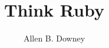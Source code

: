 \documentclass[10pt]{book}
\title{Think Ruby}
\author{Allen B. Downey}
\newif\ifplastex
\begin{document}
\frontmatter

\ifplastex
    \usepackage{localdef}
    \maketitle

\newcount\anchorcnt
\newcommand*{\Anchor}[1]{%
  \@bsphack%
    \Hy@GlobalStepCount\anchorcnt%
    \edef\@currentHref{anchor.\the\anchorcnt}%
    \Hy@raisedlink{\hyper@anchorstart{\@currentHref}\hyper@anchorend}%
    \M@gettitle{}\label{#1}%
    \@esphack%
}


\else

\newtheorem{exercise}{Exercise}[chapter]



\end{document}
